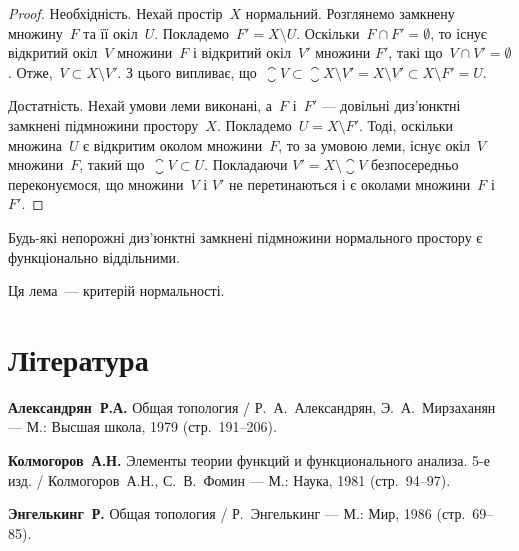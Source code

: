 \begin{proof}
Необхідність. Нехай простір~$X$ нормальний.
Розглянемо замкнену множину~$F$ та її окіл~$U$.
Покладемо~$F' = X \setminus U$. Оскільки~$F \cap F' = \emptyset$, то існує
відкритий окіл~$V$ множини~$F$ і відкритий окіл~$V'$ множини
$F'$, такі що~$V \cap V' = \emptyset$. Отже,~$V \subset X \setminus V'$. З цього
випливає, що~$\closure{V} \subset \closure{X \setminus V'} = X \setminus V' \subset X \setminus F' = U$.

Достатність. Нехай умови леми виконані, а~$F$ і~$F'$ ---
довільні диз'юнктні замкнені підмножини простору~$X$.
Покладемо~$U = X \setminus F'$. Тоді, оскільки множина~$U$ є
відкритим околом множини~$F$, то за умовою леми, існує
окіл~$V$ множини~$F$, такий що~$\closure{V} \subset U$. Покладаючи
$V' = X \setminus \closure{V}$ безпосередньо переконуємося, що множини~$V$ і
$V'$ не перетинаються і є околами множини~$F$ і~$F'$.
\end{proof}

\begin{theorem}
Будь-які непорожні диз'юнктні
замкнені підмножини нормального простору є
функціонально віддільними.
\end{theorem}

\begin{remark}
Ця лема~--- критерій нормальності.
\end{remark}

\section{Література}

\begin{enumerate}[label={[\arabic*]}]
\item \textbf{Александрян~Р.А.}
Общая топология /
Р.~А.~Александрян, Э.~А.~Мирзаханян ---
М.: Высшая школа, 1979 (стр.~191--206).
\item \textbf{Колмогоров~А.Н.}
Элементы теории функций и функционального анализа. 5-е изд. /
Колмогоров~А.Н., С.~В.~Фомин ---
М.: Наука, 1981 (стр.~94--97).
\item \textbf{Энгелькинг~Р.}
Общая топология /
Р.~Энгелькинг ---
М.: Мир, 1986 (стр.~69--85).
\end{enumerate}